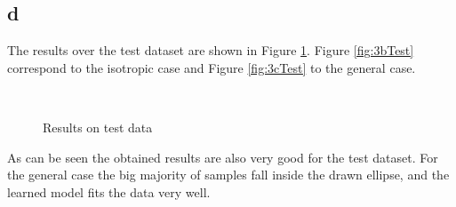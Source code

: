 \documentclass[12pt]{article}
\begin{document}
\subsection*{d}
The results over the test dataset are shown in Figure \ref{fig:3d}. Figure \ref{fig:3bTest} correspond to the isotropic case and Figure \ref{fig:3cTest} to the general case.
\begin{figure} [h!]
\centering
   \hspace{20pt}
   \\
  \caption{Results on test data} 
  \label{fig:3d}
\end{figure}
As can be seen the obtained results are also very good for the test dataset. For the general case the big majority of samples fall inside the drawn ellipse, and the learned model fits the data very well.\\
\end{document}

